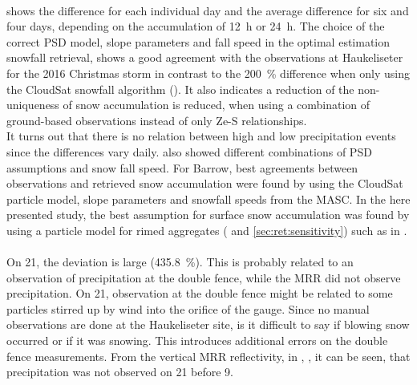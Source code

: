 \\
 shows the difference for each individual day and the average difference for six and four days, depending on the accumulation of \SI{12}{\hour} or \SI{24}{\hour}.
The choice of the correct PSD model, slope parameters and fall speed in the optimal estimation snowfall retrieval, shows a good agreement with the observations at Haukeliseter for the 2016 Christmas storm in contrast to the \SI{200}{\percent} difference when only using the CloudSat snowfall algorithm (). It also indicates a reduction of the non-uniqueness of snow accumulation is reduced, when using a combination of ground-based observations instead of only Ze-S relationships. 
\\
It turns out that there is no relation between high and low precipitation events since the differences vary daily. \citet{cooper_variational_2017} also showed different combinations of PSD assumptions and snow fall speed. For Barrow, best agreements between observations and retrieved snow accumulation were found by using the CloudSat particle model, slope parameters and snowfall speeds from the MASC. In the here presented study, the best assumption for surface snow accumulation was found by using a particle model for rimed aggregates ( and \ref{sec:ret:sensitivity}) such as in . 
\\
\\
On \SI{21}{\dec}, the deviation is large (\SI{435.8}{\percent}). This is probably related to an observation of precipitation at the double fence, while the MRR did not observe precipitation.
On \SI{21}{\dec}, observation at the double fence might be related to some particles stirred up by wind into the orifice of the gauge. Since no manual observations are done at the Haukeliseter site, is it difficult to say if blowing snow occurred or if it was snowing. This introduces additional errors on the double fence measurements. From the vertical MRR reflectivity, in , , it can be seen, that precipitation was not observed on \SI{21}{\dec} before \SI{9}{\UTC}.
